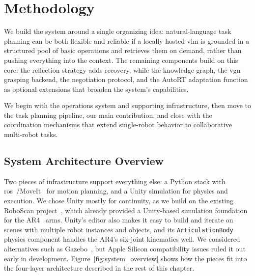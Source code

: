 \documentclass[
     12pt,
     a4paper,
     BCOR=10mm,
     DIV=14,
     listof=totoc,
     bibliography=totoc,
     parskip,
     twoside,
     headsepline
     ]{scrreprt}
\begin{document}
\chapter{Methodology}\label{methodology}
We build the system around a single organizing idea: natural-language task planning can be both flexible and reliable if a locally hosted \gls{vlm} is grounded in a structured pool of basic operations and retrieves them on demand, rather than pushing everything into the context. The remaining components build on this core: the reflection strategy adds recovery, while the knowledge graph, the \gls{vgn} grasping backend, the negotiation protocol, and the AutoRT adaptation function as optional extensions that broaden the system's capabilities.

We begin with the operations system and supporting infrastructure, then move to the task planning pipeline, our main contribution, and close with the coordination mechanisms that extend single-robot behavior to collaborative multi-robot tasks.

\section{System Architecture Overview}\label{sec:overview}
Two pieces of infrastructure support everything else: a Python stack with \gls{ros}~\cite{Macenski_2022}/\allowbreak MoveIt~\cite{coleman2014reducingbarrierentrycomplex} for motion planning, and a Unity simulation for physics and execution. We chose Unity mostly for continuity, as we build on the existing RoboScan project~\cite{roboscan}, which already provided a Unity-based simulation foundation for the AR4~\cite{AnninRobotics2026} arms. Unity's editor also makes it easy to build and iterate on scenes with multiple robot instances and objects, and its \texttt{ArticulationBody} physics component handles the AR4's six-joint kinematics well. We considered alternatives such as Gazebo~\cite{gazebo}, but Apple Silicon compatibility issues ruled it out early in development. Figure~\ref{fig:system_overview} shows how the pieces fit into the four-layer architecture described in the rest of this chapter.
\end{document}
